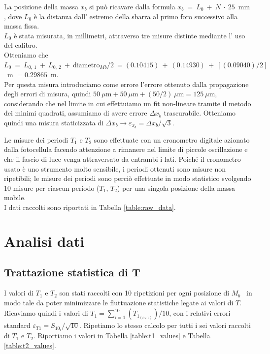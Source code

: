 \documentclass[italian, a4paper, 10pt, twocolumn]{../../style/lab_unige}
\newcommand{\reftab}[1]{Tabella {\ref{#1}}}%
\newcommand{\mstdErr}[1]{\varepsilon_{#1}}
\newcommand{\Ti}[1]{$T_{#1}$}
\newcommand{\Mb}{$M_b$}
\begin{document}
    La posizione della massa $x_b$ si può ricavare dalla formula $x_b~=~L_0~+~N~\cdot~25$~mm , dove $L_0$ è la distanza dall’ estremo della sbarra al primo foro successivo alla massa fissa.\\
    $L_0$ è stata misurata, in millimetri, attraverso tre misure distinte mediante l’ uso del calibro. \\
    Otteniamo che $L_0~=~L_{0,~1}~+~L_{0,~2}~+~\text{diametro}_{Mb}/2~= (0.10415)~+~(0.14930)~+~[(0.09040)/2]$~m $ = 0.29865$~m.\\
    Per questa misura introduciamo come errore l'errore ottenuto dalla propagazione degli errori di misura, quindi $50~\mu\text{m}+50~\mu\text{m}+(50/2)~\mu\text{m}=125~\mu\text{m}$, considerando che nel limite in cui effettuiamo un fit non-lineare tramite il metodo dei minimi quadrati, assumiamo di avere errore $\Delta x_b$ trascurabile. Otteniamo quindi una misura staticizzata di $\Delta x_b \to \mstdErr{x_b} = \Delta x_b / \sqrt{3}$.

    Le misure dei periodi \Ti{1} e \Ti{2} sono effettuate con un cronometro digitale azionato dalla fotocellula facendo attenzione a rimanere nel limite di piccole oscillazione e che il fascio di luce venga attraversato da entrambi i lati.
    Poiché il cronometro usato è uno strumento molto sensibile, i periodi ottenuti sono misure non ripetibili;  le misure dei periodi sono perciò effettuate in modo statistico svolgendo 10 misure per ciascun periodo (\Ti{1}, \Ti{2}) per una singola posizione della massa mobile.\\
    I dati raccolti sono riportati in \reftab{table:raw_data}.

    \section{Analisi dati}
    \label{section:analysis}

    \subsection{Trattazione statistica di T}
    I valori di \Ti{1} e \Ti{2} son stati raccolti con 10 ripetizioni per ogni posizione di \Mb~ in modo tale da poter minimizzare le fluttuazione statistiche legate ai valori di $T$. Ricaviamo quindi i valori di $\bar{T_1}=\sum_{i=1}^{10}(T_{1_{(i\times1)}})/10$, con i relativi errori standard $\varepsilon_{T1}=S_{10_i}/\sqrt{10}$. Ripetiamo lo stesso calcolo per tutti i sei valori raccolti di $T_1$ e $T_2$. Riportiamo i valori in \reftab{table:t1_values} e \reftab{table:t2_values}.
    
\end{document}
